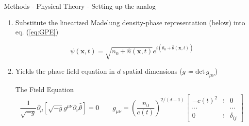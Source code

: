 \documentclass[aspectratio=169]{beamer}
\begin{document}
            \begin{frame}{Methods - Physical Theory - Setting up the analog}
                \begin{enumerate}
                    \item Substitute the linearized Madelung density-phase representation (below) into eq. (\ref{eq:GPE})
            
                        \begin{equation} \label{eq:Madelung}
                            \psi(\mathbf{x}, t) = \sqrt{n_0 + \hat{n}(\mathbf{x}, t)} e^{i \left( \theta_0 + \hat{\theta}(\mathbf{x}, t) \right)}
                        \end{equation}
                        
                    \item Yields the phase field equation in $d$ spatial dimensions ($g \coloneqq \text{det} \, g_{\mu \nu}$)
                        \begin{exampleblock}{\centering The Field Equation}
                        \begin{equation} \label{eq:KG}
                            \frac{1}{\sqrt{-g}} \partial_\mu \left[ \sqrt{-g} g^{\mu \nu} \partial_\nu \hat{\theta} \right] = 0
                            \qquad
                            g_{\mu \nu} = \left( \frac{n_0}{c(t)} \right)^{2 / (d - 1)} \begin{bmatrix}
                                -c(t)^2 & \vdots & 0 \\
                                \cdots & & \cdots \\
                                0 & \vdots & \delta_{ij}
                            \end{bmatrix}
                        \end{equation}
                        \end{exampleblock}
                \end{enumerate}
            \end{frame}
        
\end{document}
